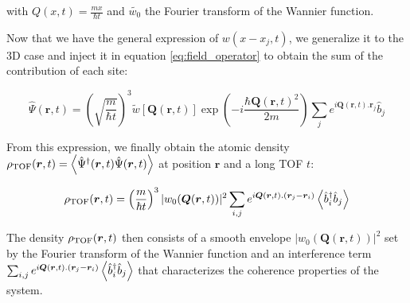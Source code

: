 \noindent with $Q(x,t)=\frac{m x}{\hbar t}$ and $\tilde{w_0}$ the Fourier transform of the Wannier function. 

Now that we have the general expression of $w\left(x-x_{j}, t\right)$, we generalize it to the 3D case and inject it in equation \ref{eq:field_operator} to obtain the sum of the contribution of each site:

\begin{equation}
    \hat{\Psi} (\bm{r},t) = \left(\sqrt{\frac{m}{\hbar t}} \right)^3 \tilde{w}[\bm{Q}(\bm{r},t)] \exp\left(-i \frac{\hbar \bm{Q}(\bm{r},t)^{2}}{2 m} \right) \sum_j e^{i \bm{Q}(\bm{r},t). \bm{r}_{j}} \hat{b}_j
\end{equation}

\noindent From this expression, we finally obtain the atomic density $\rho_{\rm{TOF}}(\bm{r},t) = \left\langle\hat{\Psi}^{\dagger} (\bm{r},t) \hat{\Psi} (\bm{r},t)\right\rangle$ at position $\bm{r}$ and a long TOF $t$:

\begin{equation}
    \rho_{\rm{TOF}}(\bm{r},t) = \left(\frac{m}{\hbar t} \right)^3 |w_0(\bm{Q}(\bm{r},t))|^2 \sum_{i,j} e^{i \bm{Q}(\bm{r},t).(\bm{r}_j - \bm{r}_{i})} \left\langle\hat{b}^{\dagger}_i \hat{b}_j \right\rangle
    \label{eq:rho_tof}
\end{equation}

\noindent The density $\rho_{\rm{TOF}}(\bm{r},t)$ then consists of a smooth envelope $|w_0(\bm{Q}(\bm{r},t))|^2$ set by the Fourier transform of the Wannier function and an interference term $\sum_{i,j} e^{i \bm{Q}(\bm{r},t).(\bm{r}_j - \bm{r}_{i})} \left\langle\hat{b}^{\dagger}_i \hat{b}_j \right\rangle$ that characterizes the coherence properties of the system. 

